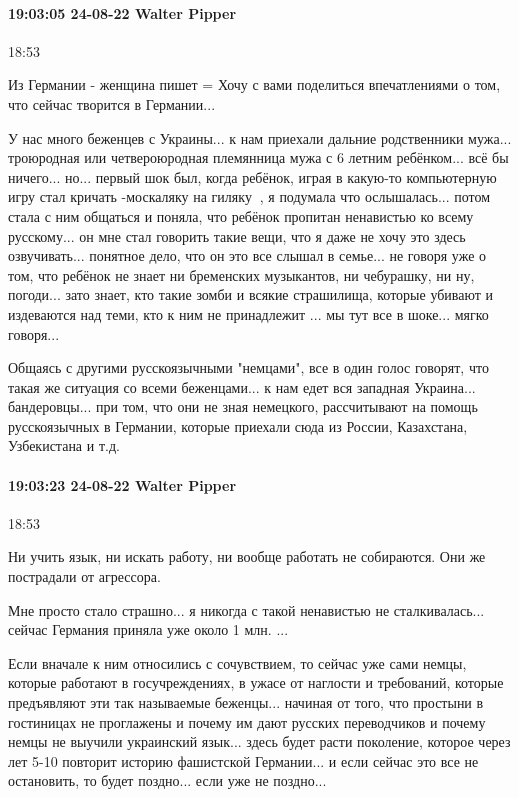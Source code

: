  
 
 
 
 

\paragraph{19:03:05 24-08-22 Walter Pipper}
18:53

Из Германии - женщина пишет = Хочу с вами поделиться впечатлениями о том, что сейчас творится в Германии...

У нас много беженцев с Украины... к нам приехали дальние родственники мужа... троюродная или четвероюродная племянница мужа с 6 летним ребёнком... всё бы ничего... но... первый шок был, когда ребёнок, играя в какую-то компьютерную игру стал кричать -москаляку на гиляку🤦‍♀, я подумала что ослышалась... потом стала с ним общаться и поняла, что ребёнок пропитан ненавистью ко всему русскому... он мне стал говорить такие вещи, что я даже не хочу это здесь озвучивать... понятное дело, что он это все слышал в семье... не говоря уже о том, что ребёнок не знает ни бременских музыкантов, ни чебурашку, ни ну, погоди... зато знает, кто такие зомби и всякие страшилища, которые убивают и издеваются над теми, кто к ним не принадлежит ... мы тут все в шоке... мягко говоря...

Общаясь с другими русскоязычными "немцами", все в один голос говорят, что такая же ситуация со всеми беженцами... к нам едет вся западная Украина... бандеровцы... при том, что они не зная немецкого, рассчитывают на помощь русскоязычных в Германии, которые приехали сюда из России, Казахстана, Узбекистана и т.д.

\paragraph{19:03:23 24-08-22 Walter Pipper}
18:53

Ни учить язык, ни искать работу, ни вообще работать не собираются. Они же пострадали от агрессора.

Мне просто стало страшно... я никогда с такой ненавистью не сталкивалась... сейчас Германия приняла уже около 1 млн. ...

Если вначале к ним относились с сочувствием, то сейчас уже сами немцы, которые работают в госучреждениях, в ужасе от наглости и требований, которые предъявляют эти так называемые беженцы... начиная от того, что простыни в гостиницах не проглажены и почему им дают русских переводчиков и почему немцы не выучили украинский язык... здесь будет расти поколение, которое через лет 5-10 повторит историю фашистской Германии... и если сейчас это все не остановить, то будет поздно... если уже не поздно...

